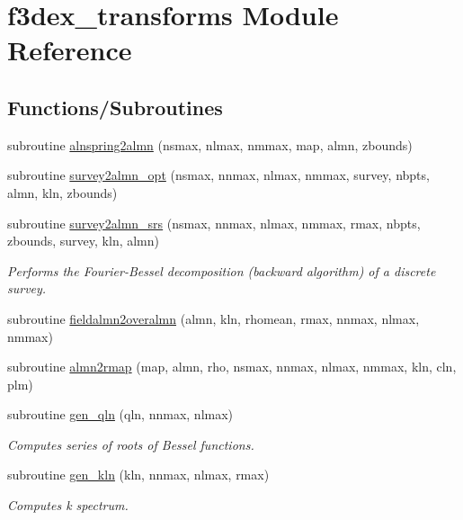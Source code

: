 \hypertarget{namespacef3dex__transforms}{
\section{f3dex\_\-transforms Module Reference}
\label{namespacef3dex__transforms}
}
\subsection*{Functions/Subroutines}
\begin{DoxyCompactItemize}
\item 
subroutine \hyperlink{namespacef3dex__transforms_aef309274871cf8eb0405b63f14ab26a2}{alnspring2almn} (nsmax, nlmax, nmmax, map, almn, zbounds)
\item 
subroutine \hyperlink{namespacef3dex__transforms_aa03041ae9480a0e4abc522b846a40cc8}{survey2almn\_\-opt} (nsmax, nnmax, nlmax, nmmax, survey, nbpts, almn, kln, zbounds)
\item 
subroutine \hyperlink{namespacef3dex__transforms_ae19f381573ccd64c64102bbd4181483f}{survey2almn\_\-srs} (nsmax, nnmax, nlmax, nmmax, rmax, nbpts, zbounds, survey, kln, almn)
\begin{DoxyCompactList}\small\item\em Performs the Fourier-\/Bessel decomposition (backward algorithm) of a discrete survey. \end{DoxyCompactList}\item 
subroutine \hyperlink{namespacef3dex__transforms_a4675d50d585b89b97772a0fa7dde4c5f}{fieldalmn2overalmn} (almn, kln, rhomean, rmax, nnmax, nlmax, nmmax)
\item 
subroutine \hyperlink{namespacef3dex__transforms_a3e792eb35f030b601d9262ac031cfdb9}{almn2rmap} (map, almn, rho, nsmax, nnmax, nlmax, nmmax, kln, cln, plm)
\item 
subroutine \hyperlink{namespacef3dex__transforms_a02b926f933d186f2c9d9ab6d478a1601}{gen\_\-qln} (qln, nnmax, nlmax)
\begin{DoxyCompactList}\small\item\em Computes series of roots of Bessel functions. \end{DoxyCompactList}\item 
subroutine \hyperlink{namespacef3dex__transforms_a4b80bc7cad52998fd0aff935a1695ee7}{gen\_\-kln} (kln, nnmax, nlmax, rmax)
\begin{DoxyCompactList}\small\item\em Computes k spectrum. \end{DoxyCompactList}\item 

\end{DoxyCompactItemize}
